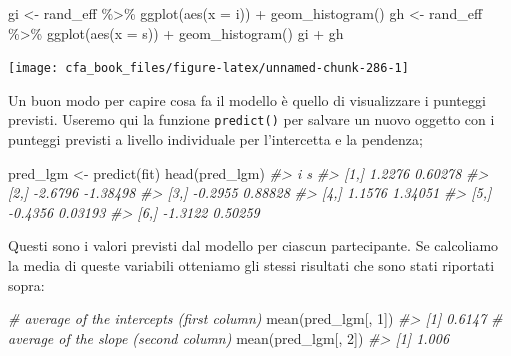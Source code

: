 \documentclass[
  11pt,
]{krantz}
\makeatletter
\newenvironment{Shaded}{\begin{snugshade}}{\end{snugshade}}
\newcommand{\AttributeTok}[1]{\textcolor[rgb]{0.61,0.61,0.61}{#1}}
\newcommand{\CommentTok}[1]{\textcolor[rgb]{0.37,0.37,0.37}{\textit{#1}}}
\newcommand{\DecValTok}[1]{\textcolor[rgb]{0.06,0.06,0.06}{#1}}
\newcommand{\FunctionTok}[1]{\textcolor[rgb]{0,0,0}{#1}}
\newcommand{\NormalTok}[1]{#1}
\newcommand{\OtherTok}[1]{\textcolor[rgb]{0.37,0.37,0.37}{#1}}
\newcommand{\SpecialCharTok}[1]{\textcolor[rgb]{0,0,0}{#1}}
\newenvironment{kframe}{%
\medskip{}
\setlength{\fboxsep}{.8em}
 \def\at@end@of@kframe{}%
 \ifinner\ifhmode%
  \def\at@end@of@kframe{\end{minipage}}%
  \begin{minipage}{\columnwidth}%
 \fi\fi%
 \def\FrameCommand##1{\hskip\@totalleftmargin \hskip-\fboxsep
 \colorbox{shadecolor}{##1}\hskip-\fboxsep
     \hskip-\linewidth \hskip-\@totalleftmargin \hskip\columnwidth}%
 \MakeFramed {\advance\hsize-\width
   \@totalleftmargin\z@ \linewidth\hsize
   \@setminipage}}%
 {\par\unskip\endMakeFramed%
 \at@end@of@kframe}
\renewenvironment{Shaded}{\begin{kframe}}{\end{kframe}}
\theoremstyle{definition}
\theoremstyle{definition}
\theoremstyle{definition}
\theoremstyle{definition}
\theoremstyle{remark}
\makeatother
\begin{document}
\begin{Shaded}
\begin{Highlighting}[]
\NormalTok{gi }\OtherTok{\textless{}{-}}\NormalTok{ rand\_eff }\SpecialCharTok{\%\textgreater{}\%}
  \FunctionTok{ggplot}\NormalTok{(}\FunctionTok{aes}\NormalTok{(}\AttributeTok{x =}\NormalTok{ i)) }\SpecialCharTok{+}
  \FunctionTok{geom\_histogram}\NormalTok{()}
\NormalTok{gh }\OtherTok{\textless{}{-}}\NormalTok{ rand\_eff }\SpecialCharTok{\%\textgreater{}\%}
  \FunctionTok{ggplot}\NormalTok{(}\FunctionTok{aes}\NormalTok{(}\AttributeTok{x =}\NormalTok{ s)) }\SpecialCharTok{+}
  \FunctionTok{geom\_histogram}\NormalTok{()}
\NormalTok{gi }\SpecialCharTok{+}\NormalTok{ gh}
\end{Highlighting}
\end{Shaded}

\begin{center}\texttt{[image: cfa\_book\_files/figure-latex/unnamed-chunk-286-1]} \end{center}

Un buon modo per capire cosa fa il modello è quello di visualizzare i punteggi previsti. Useremo qui la funzione \texttt{predict()} per salvare un nuovo oggetto con i punteggi previsti a livello individuale per l'intercetta e la pendenza;

\begin{Shaded}
\begin{Highlighting}[]
\NormalTok{pred\_lgm }\OtherTok{\textless{}{-}} \FunctionTok{predict}\NormalTok{(fit)}
\FunctionTok{head}\NormalTok{(pred\_lgm)}
\CommentTok{\#\textgreater{}            i        s}
\CommentTok{\#\textgreater{} [1,]  1.2276  0.60278}
\CommentTok{\#\textgreater{} [2,] {-}2.6796 {-}1.38498}
\CommentTok{\#\textgreater{} [3,] {-}0.2955  0.88828}
\CommentTok{\#\textgreater{} [4,]  1.1576  1.34051}
\CommentTok{\#\textgreater{} [5,] {-}0.4356  0.03193}
\CommentTok{\#\textgreater{} [6,] {-}1.3122  0.50259}
\end{Highlighting}
\end{Shaded}

Questi sono i valori previsti dal modello per ciascun partecipante. Se calcoliamo la media di queste variabili otteniamo gli stessi risultati che sono stati riportati sopra:

\begin{Shaded}
\begin{Highlighting}[]
\CommentTok{\# average of the intercepts (first column)}
\FunctionTok{mean}\NormalTok{(pred\_lgm[, }\DecValTok{1}\NormalTok{])}
\CommentTok{\#\textgreater{} [1] 0.6147}
\CommentTok{\# average of the slope (second column)}
\FunctionTok{mean}\NormalTok{(pred\_lgm[, }\DecValTok{2}\NormalTok{])}
\CommentTok{\#\textgreater{} [1] 1.006}
\end{Highlighting}
\end{Shaded}
\end{document}

